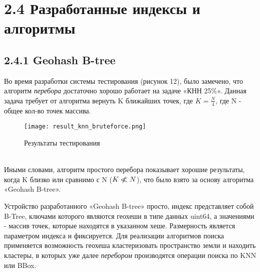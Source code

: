 \section{2.4 Разработанные индексы и алгоритмы}

\subsection{2.4.1 Geohash B-tree}
Во время разработки системы тестирования (рисунок 12), было замечено, что алгоритм \textit{перебора} достаточно хорошо работает на задаче «КНН 25\%». Данная задача требует от алгоритма вернуть K ближайших точек, где $K = \frac{N}{4}$, где N - общее кол-во точек массива. 
  \\
\begin{figure}[h]
    \centering
    \texttt{[image: result\_knn\_bruteforce.png]}
    \caption{Результаты тестирования}
\end{figure}
  \\
Иными словами, алгоритм простого перебора показывает хорошие результаты, когда K близко или сравнимо с N ($K \centernot \ll N$), что было взято за основу алгоритма «Geohash B-tree». 

Устройство разработанного «Geohash B-tree» просто, индекс представляет собой B-Tree\cite{comerBTree}, ключами которого являются геохеши в типе данных uint64, а значениями - массив точек, которые находятся в указанном хеше. Размерность является параметром индекса и фиксируется. Для реализации алгоритмов поиска применяется возможность геохеша кластеризовать пространство земли и находить кластеры, в которых уже далее \textit{перебором} производятся операции поиска по KNN или BBox\cite{gulakovStructured}.

